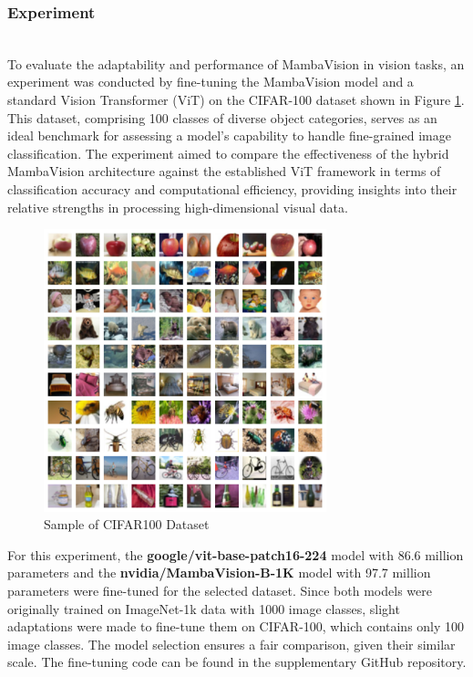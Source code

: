 \documentclass[12pt, conference, compsoc, onecolumn]{IEEEtran}
\begin{document}
	\subsubsection{Experiment}
	\hfill\\
	
	To evaluate the adaptability and performance of MambaVision in vision tasks, an experiment was conducted by fine-tuning the MambaVision model and a standard Vision Transformer (ViT) on the CIFAR-100 dataset \cite{Krizhevsky09cifar100} shown in Figure \ref{fig:cifar100}. This dataset, comprising 100 classes of diverse object categories, serves as an ideal benchmark for assessing a model's capability to handle fine-grained image classification. The experiment aimed to compare the effectiveness of the hybrid MambaVision architecture against the established ViT framework in terms of classification accuracy and computational efficiency, providing insights into their relative strengths in processing high-dimensional visual data.
	
	\begin{figure}[H]
		\centering
		\includegraphics[width=0.73\textwidth]{figures/cifar100_sample.png}
		\caption{Sample of CIFAR100 Dataset\cite{Krizhevsky09cifar100}}
		\label{fig:cifar100}
	\end{figure}
	

	For this experiment, the \textbf{google/vit-base-patch16-224} \cite{wu2020visual} model with 86.6 million parameters and the \textbf{nvidia/MambaVision-B-1K} \cite{hatamizadeh2024mambavision} model with 97.7 million parameters were fine-tuned for the selected dataset. Since both models were originally trained on ImageNet-1k data with 1000 image classes, slight adaptations were made to fine-tune them on CIFAR-100, which contains only 100 image classes. The model selection ensures a fair comparison, given their similar scale. The fine-tuning code can be found in the supplementary GitHub repository.
	
\end{document}

